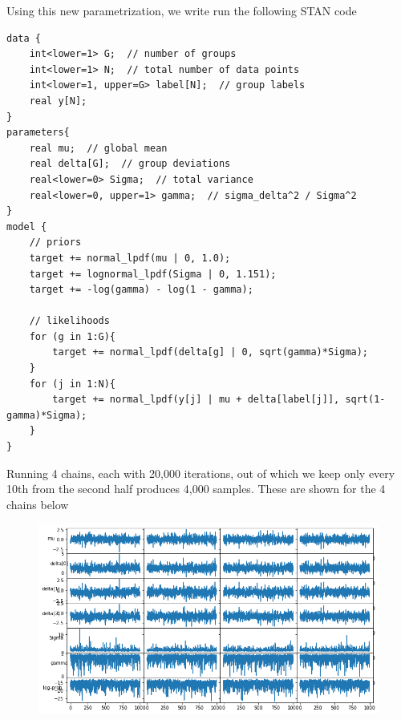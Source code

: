 \documentclass[10pt,oneside]{article}
\begin{document}
Using this new parametrization, we write run the following STAN code
\begin{lstlisting}[language={}]
data {
    int<lower=1> G;  // number of groups
    int<lower=1> N;  // total number of data points
    int<lower=1, upper=G> label[N];  // group labels
    real y[N];
}
parameters{
    real mu;  // global mean
    real delta[G];  // group deviations
    real<lower=0> Sigma;  // total variance
    real<lower=0, upper=1> gamma;  // sigma_delta^2 / Sigma^2
}
model {
    // priors
    target += normal_lpdf(mu | 0, 1.0);
    target += lognormal_lpdf(Sigma | 0, 1.151);
    target += -log(gamma) - log(1 - gamma);
    
    // likelihoods
    for (g in 1:G){
        target += normal_lpdf(delta[g] | 0, sqrt(gamma)*Sigma);
    }
    for (j in 1:N){
        target += normal_lpdf(y[j] | mu + delta[label[j]], sqrt(1-gamma)*Sigma);
    }
}
\end{lstlisting}
Running 4 chains, each with 20,000 iterations, out of which we keep only every 10th from the second half produces 4,000 samples. These are shown for the 4 chains below
\begin{figure}[h]
\centering
\includegraphics[width=\textwidth]{P5-chains2.png}
\end{figure}
\end{document}
